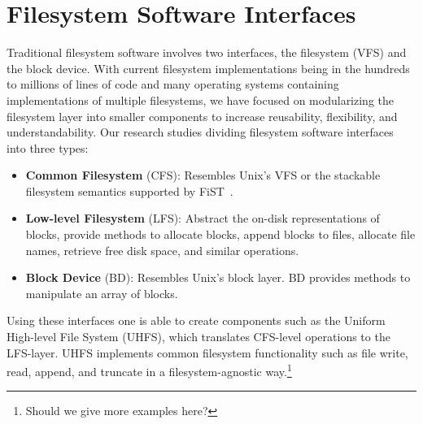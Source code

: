\section{Filesystem Software Interfaces}

Traditional filesystem software involves two interfaces, the
filesystem (VFS) and the block device. With current filesystem
implementations being in the hundreds to millions of lines of code and
many operating systems containing implementations of multiple
filesystems, we have focused on modularizing the filesystem layer into
smaller components to increase reusability, flexibility, and
understandability. Our research studies dividing filesystem software
interfaces into three types:

\begin{itemize}
\item \itemvspace{} \textbf{Common Filesystem} (CFS): Resembles Unix's VFS or the
  stackable filesystem semantics supported by FiST~\cite{fist}.
\item \itemvspace{} \textbf{Low-level Filesystem} (LFS): Abstract the on-disk
  representations of blocks, provide methods to allocate blocks,
  append blocks to files, allocate file names, retrieve free disk
  space, and similar operations.
\item \itemvspace{} \textbf{Block Device} (BD): Resembles Unix's block layer. BD
  provides methods to manipulate an array of blocks.
\end{itemize}
\postlistspacing{}

Using these interfaces one is able to create components such as the
Uniform High-level File System (UHFS), which translates CFS-level
operations to the LFS-layer. UHFS implements common filesystem
functionality such as file write, read, append, and truncate in a
filesystem-agnostic way.\footnote{Should we give more examples here?}
